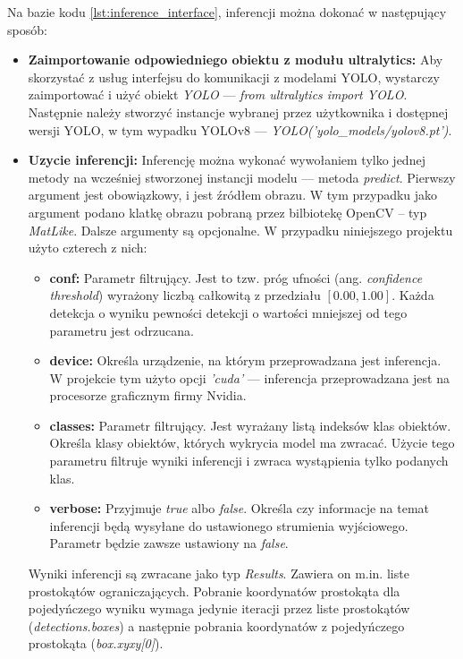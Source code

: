 Na bazie kodu \ref{lst:inference_interface}, inferencji można dokonać w następujący sposób:
\begin{itemize}
    \item \textbf{Zaimportowanie odpowiedniego obiektu z modułu ultralytics:} Aby skorzystać z usług interfejsu do komunikacji z modelami YOLO, wystarczy zaimportować i użyć obiekt \emph{YOLO} --- \emph{from ultralytics import YOLO}. Następnie należy stworzyć instancje wybranej przez użytkownika i dostępnej wersji YOLO, w tym wypadku YOLOv8 --- \emph{YOLO('yolo\_models/yolov8.pt')}.

    \item \textbf{Uzycie inferencji:} Inferencję można wykonać wywołaniem tylko jednej metody na wcześniej stworzonej instancji modelu --- metoda \emph{predict}. Pierwszy argument jest obowiązkowy, i jest źródłem obrazu. W tym przypadku jako argument podano klatkę obrazu pobraną przez bilbiotekę OpenCV -- typ \emph{MatLike}. Dalsze argumenty są opcjonalne. W przypadku niniejszego projektu użyto czterech z nich:
    \begin{itemize}
        \item \textbf{conf:} Parametr filtrujący. Jest to tzw. próg ufności (ang. \emph{confidence threshold}) wyrażony liczbą całkowitą z przedziału $[0.00, 1.00]$. Każda detekcja o wyniku pewności detekcji o wartości mniejszej od tego parametru jest odrzucana. 
        \item \textbf{device:} Określa urządzenie, na którym przeprowadzana jest inferencja. W projekcie tym użyto opcji \emph{'cuda'} --- inferencja przeprowadzana jest na procesorze graficznym firmy Nvidia.
        \item \textbf{classes:} Parametr filtrujący. Jest wyrażany listą indeksów klas obiektów. Określa klasy obiektów, których wykrycia model ma zwracać.
        Użycie tego parametru filtruje wyniki inferencji i zwraca wystąpienia tylko podanych klas. 
        \item \textbf{verbose:} Przyjmuje \emph{true} albo \emph{false}. Określa czy informacje na temat inferencji będą wysyłane do ustawionego strumienia wyjściowego. Parametr będzie zawsze ustawiony na \emph{false}.
    \end{itemize}
    Wyniki inferencji są zwracane jako typ \emph{Results}. Zawiera on m.in. liste prostokątów ograniczających. Pobranie koordynatów prostokąta dla pojedyńczego wyniku wymaga jedynie iteracji przez liste prostokątów (\emph{detections.boxes}) a następnie pobrania koordynatów z pojedyńczego prostokąta (\emph{box.xyxy[0]}).
\end{itemize}

